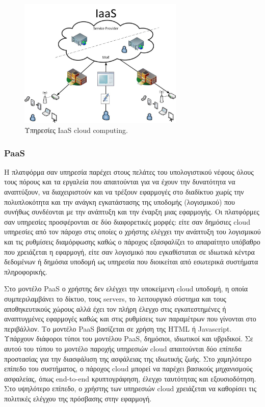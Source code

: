 		\begin{figure}[h]
	    \centering
	    \includegraphics[width=0.7\textwidth]{IaaS.jpg}
	    \caption{ Υπηρεσίες IaaS cloud computing.  }
	    \label{fig:iaas}
	\end{figure}
		
		\subsubsection{PaaS}
	
		Η πλατφόρμα σαν υπηρεσία παρέχει στους πελάτες του υπολογιστικού νέφους όλους τους πόρους και τα εργαλεία που απαιτούνται για να έχουν την δυνατότητα να αναπτύξουν, να διαχειριστούν και να τρέξουν εφαρμογές στο διαδίκτυο χωρίς την πολυπλοκότητα και την ανάγκη εγκατάστασης της υποδομής (λογισμικού) που συνήθως συνδέονται με την ανάπτυξη και την έναρξη μιας εφαρμογής. Οι πλατφόρμες σαν υπηρεσίες προσφέρονται σε δύο διαφορετικές μορφές: είτε σαν δημόσιες cloud υπηρεσίες από τον πάροχο στις οποίες  ο χρήστης  ελέγχει την ανάπτυξη του λογισμικού και τις ρυθμίσεις διαμόρφωσης καθώς ο πάροχος εξασφαλίζει το απαραίτητο υπόβαθρο που χρειάζεται η εφαρμογή, είτε σαν λογισμικό που εγκαθίσταται σε ιδιωτικά κέντρα δεδομένων ή δημόσια υποδομή ως υπηρεσία που διοικείται από εσωτερικά συστήματα πληροφορικής. \cite{Peng2009}
		
		Στο μοντέλο PaaS ο χρήστης δεν ελέγχει την υποκείμενη cloud υποδομή, η οποία συμπεριλαμβάνει το δίκτυο, τους servers, το λειτουργικό σύστημα και τους αποθηκευτικούς χώρους αλλά έχει τον πλήρη έλεγχο στις εγκατεστημένες ή αναπτυγμένες εφαρμογές καθώς και στις ρυθμίσεις των παραμέτρων που γίνονται στο περιβάλλον. Το μοντέλο PaaS βασίζεται σε χρήση της HTML ή Javascript. Υπάρχουν διάφοροι τύποι του μοντέλου PaaS, δημόσιοι, ιδιωτικοί και υβριδικοί. Σε αυτού του τύπου το μοντέλο παροχής υπηρεσιών cloud απαιτούνται δύο επίπεδα προστασίας για την διασφάλιση της ασφάλειας της ιδιωτικής ζωής. Στο χαμηλότερο επίπεδο του συστήματος, ο πάροχος cloud μπορεί να παρέχει βασικούς μηχανισμούς ασφαλείας, όπως end-to-end κρυπτογράφηση, έλεγχο ταυτότητας και εξουσιοδότηση. Στο υψηλότερο επίπεδο, ο  χρήστης των υπηρεσιών cloud χρειάζεται να καθορίσει τις πολιτικές ελέγχου της πρόσβασης στην εφαρμογή.\cite{Kanagaraj2011}
		
